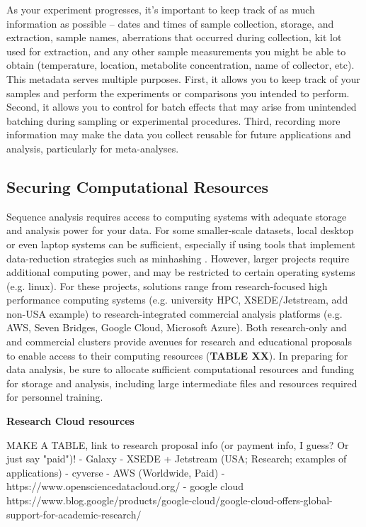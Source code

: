 \documentclass[10pt,letterpaper]{article}
\begin{document}
As your experiment progresses, it’s important to keep track of as much information as possible -- dates and times of sample collection, storage, and extraction, sample names, aberrations that occurred during collection, kit lot used for extraction, and any other sample measurements you might be able to obtain (temperature, location, metabolite concentration, name of collector, etc). This metadata serves multiple purposes. First, it allows you to keep track of your samples and perform the experiments or comparisons you intended to perform. Second, it allows you to control for batch effects that may arise from unintended batching during sampling or experimental procedures. Third, recording more information may make the data you collect reusable for future applications and analysis, particularly for meta-analyses. 

\subsection*{Securing Computational Resources}

Sequence analysis requires access to computing systems with adequate storage and analysis power for your data. For some smaller-scale datasets, local desktop or even laptop systems can be sufficient, especially if using tools that implement data-reduction strategies such as minhashing \cite{rowe2019streaming}. However, larger projects require additional computing power, and may be restricted to certain operating systems (e.g. linux). For these projects, solutions range from research-focused high performance computing systems (e.g. university HPC, XSEDE/Jetstream, add non-USA example) to research-integrated commercial analysis platforms (e.g. AWS, Seven Bridges, Google Cloud, Microsoft Azure). Both research-only and  and commercial clusters provide avenues for research and educational proposals to enable access to their computing resources (\textbf{TABLE XX}). In preparing for data analysis, be sure to allocate sufficient computational resources and funding for storage and analysis, including large intermediate files and resources required for personnel training. 


\begin{greybox}{\textbf{Research Cloud resources}
 
MAKE A TABLE, link to research proposal info (or payment info, I guess? Or just say "paid")!
   - Galaxy
   - XSEDE + Jetstream (USA; Research; examples of applications)
   - cyverse
   - AWS (Worldwide, Paid)
   - https://www.opensciencedatacloud.org/
   - google cloud https://www.blog.google/products/google-cloud/google-cloud-offers-global-support-for-academic-research/
   }
 \end{greybox}
\end{document}
